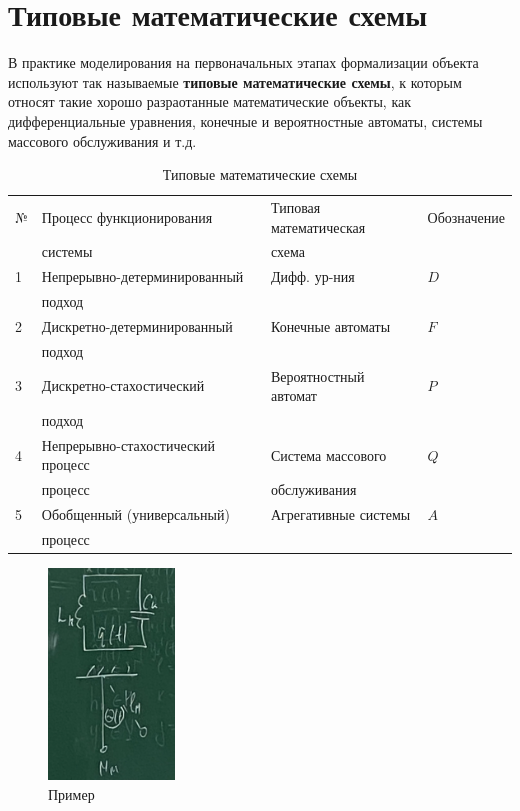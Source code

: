 \section{Типовые математические схемы}

В практике моделирования на первоначальных этапах формализации объекта используют так называемые \textbf{типовые математические схемы}, к которым относят такие хорошо разраотанные математические объекты, как дифференциальные уравнения, конечные и вероятностные автоматы, системы массового обслуживания и т.д.

\begin{table}[H]
    \centering
    \caption{Типовые математические схемы}
    \label{tab:label}
    \begin{tabular}{|l|l|l|l|}
        \hline
        № & Процесс функционирования & Типовая математическая & Обозначение \\
          & системы & схема & \\
        \hline
        1 & Непрерывно-детерминированный & Дифф. ур-ния & $D$ \\
          & подход & & \\
        \hline
        2 & Дискретно-детерминированный & Конечные автоматы & $F$ \\
          & подход & & \\
        \hline
        3 & Дискретно-стахостический & Вероятностный автомат & $P$ \\
          & подход & & \\
        \hline
        4 & Непрерывно-стахостический процесс & Система массового & $Q$ \\
          & процесс & обслуживания & \\
        \hline
        5 & Обобщенный (универсальный) & Агрегативные системы & $A$ \\
          & процесс & & \\
        \hline
    \end{tabular}
\end{table}

\begin{figure}[H]
    \centering
    \includegraphics[width=0.3\textwidth]{img/content/06_types_schemes/example.png}
    \caption{Пример}
\end{figure}

